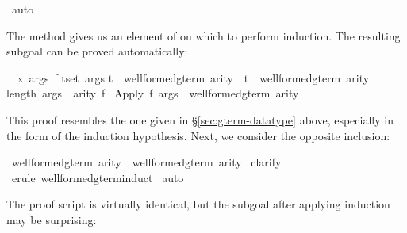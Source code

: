 \begin{isabellebody}
\ auto\isanewline
{}\isamarkupfalse%
%
\endisatagproof
{\isafoldproof}%
%
\isadelimproof
%
\endisadelimproof
%
\isadelimproof
%
\endisadelimproof
%
\isatagproof
%
\begin{isamarkuptxt}%
The  method gives
us an element of  on which to perform 
induction.  The resulting subgoal can be proved automatically:
\begin{isabelle}%
\ {}{\isachardot}\ {\isasymAnd}x\ args\ f{\isachardot}\isanewline
{}t{\isasymin}set\ args{\isachardot}\isanewline
{}t\ {\isasymin}\ well{\isacharunderscore}formed{\isacharunderscore}gterm\ arity\ {\isasymand}\ t\ {\isasymin}\ well{\isacharunderscore}formed{\isacharunderscore}gterm{\isacharprime}\ arity{\isacharsemicolon}\isanewline
{}length\ args\ {\isacharequal}\ arity\ f{\isasymrbrakk}\isanewline
{}\ Apply\ f\ args\ {\isasymin}\ well{\isacharunderscore}formed{\isacharunderscore}gterm{\isacharprime}\ arity%
\end{isabelle}
This proof resembles the one given in
{\S}\ref{sec:gterm-datatype} above, especially in the form of the
induction hypothesis.  Next, we consider the opposite inclusion:%
\end{isamarkuptxt}%
\isamarkuptrue%
%
\endisatagproof
{\isafoldproof}%
%
\isadelimproof
%
\endisadelimproof
{}\isamarkupfalse%
\ {\isachardoublequoteopen}well{\isacharunderscore}formed{\isacharunderscore}gterm{\isacharprime}\ arity\ {\isasymsubseteq}\ well{\isacharunderscore}formed{\isacharunderscore}gterm\ arity{\isachardoublequoteclose}\isanewline
%
\isadelimproof
%
\endisadelimproof
%
\isatagproof
{}\isamarkupfalse%
\ clarify\isanewline
{}\isamarkupfalse%
\ {\isacharparenleft}erule\ well{\isacharunderscore}formed{\isacharunderscore}gterm{\isacharprime}{\isachardot}induct{\isacharparenright}\isanewline
{}\isamarkupfalse%
\ auto\isanewline
{}\isamarkupfalse%
%
\endisatagproof
{\isafoldproof}%
%
\isadelimproof
%
\endisadelimproof
%
\isadelimproof
%
\endisadelimproof
%
\isatagproof
%
\begin{isamarkuptxt}%
The proof script is virtually identical,
but the subgoal after applying induction may be surprising:
\begin{isabelle}%

\end{isabelle}
\end{isamarkuptxt}
\end{isabellebody}
